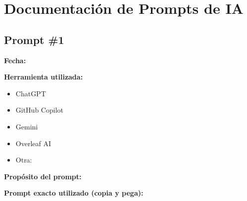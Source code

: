 
\newpage
\appendix
\section{Documentación de Prompts de IA}

\begin{center}
\end{center}

\vspace{0.5cm}

\subsection*{Prompt \#1}

\textbf{Fecha:} \underline{\hspace{5cm}}

\textbf{Herramienta utilizada:} 
\begin{itemize}
    \item[ ] ChatGPT
    \item[ ] GitHub Copilot
    \item[ ] Gemini
    \item[ ] Overleaf AI
    \item[ ] Otra: \underline{\hspace{4cm}}
\end{itemize}

\textbf{Propósito del prompt:} 
\vspace{0.2cm}
\underline{\hspace{12cm}}
\vspace{0.2cm}
\underline{\hspace{12cm}}

\textbf{Prompt exacto utilizado (copia y pega):}
\begin{verbatim}





\end{verbatim}

